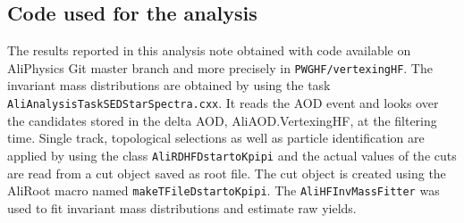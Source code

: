 \subsection{Code used for the analysis}
The results reported in this analysis note obtained with code available on AliPhysics Git master branch and more precisely in \texttt{PWGHF/vertexingHF}. The \Dstar invariant mass distributions are obtained by using the task \texttt{AliAnalysisTaskSEDStarSpectra.cxx}. It reads the AOD event and looks over the \Dstar candidates stored in the delta AOD, AliAOD.VertexingHF, at the filtering time. Single track, topological selections as well as particle identification are applied by using the class  \texttt{AliRDHFDstartoKpipi} and the actual values of the cuts are read from a cut object saved as root file. The cut object is created using the AliRoot macro named \texttt{makeTFileDstartoKpipi}. The \texttt{AliHFInvMassFitter} was used to fit invariant mass distributions and estimate raw yields.


